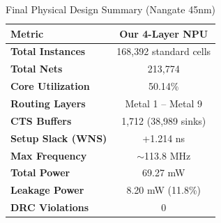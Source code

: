 \begin{table}[ht]
\centering
\caption{Final Physical Design Summary (Nangate 45nm)}
\label{tab:physical_summary}
\begin{tabular}{|l|c|}
\hline
\textbf{Metric} & \textbf{Our 4-Layer NPU} \\ \hline
\textbf{Total Instances} & 168,392 standard cells \\ \hline
\textbf{Total Nets} & 213,774 \\ \hline
\textbf{Core Utilization} & 50.14\% \\ \hline
\textbf{Routing Layers} & Metal 1 -- Metal 9 \\ \hline
\textbf{CTS Buffers} & 1,712 (38,989 sinks) \\ \hline
\textbf{Setup Slack (WNS)} & +1.214 ns \\ \hline
\textbf{Max Frequency} & $\sim$113.8 MHz \\ \hline
\textbf{Total Power} & 69.27 mW \\ \hline
\textbf{Leakage Power} & 8.20 mW (11.8\%) \\ \hline
\textbf{DRC Violations} & 0 \\ \hline
\end{tabular}
\end{table}
